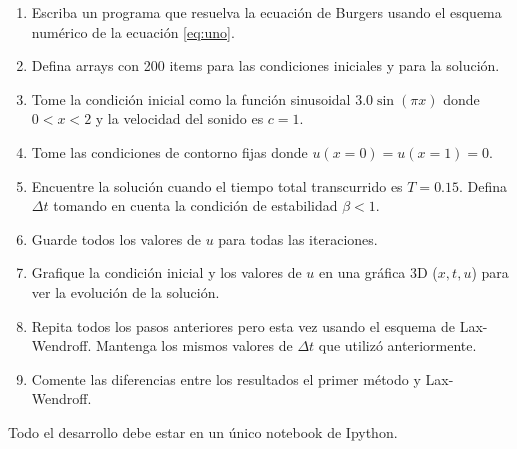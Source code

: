 \documentclass{article}
\begin{document}
\begin{enumerate}
\item Escriba un programa que resuelva la ecuaci\'on de Burgers usando
  el esquema num\'erico de la ecuaci\'on \ref{eq:uno}. 
\item Defina arrays con 200 items para las condiciones iniciales y
  para la soluci\'on.
\item Tome la condici\'on inicial como la funci\'on sinusoidal
  $3.0\sin(\pi x)$ donde $0<x<2$ y la velocidad del sonido es $c=1$.
\item Tome las condiciones de contorno fijas donde $u(x=0)=u(x=1)=0$.
\item Encuentre la soluci\'on cuando el tiempo total transcurrido es
  $T=0.15$. Defina $\Delta t$ tomando en cuenta la condici\'on de
  estabilidad $\beta<1$. 
\item Guarde todos los valores de $u$ para todas las iteraciones.
\item Grafique la condici\'on inicial y los valores de $u$ en una
  gr\'afica 3D ($x,t,u$) para ver la evoluci\'on de la soluci\'on.
\item Repita todos los pasos anteriores pero esta vez usando el
  esquema de Lax-Wendroff. Mantenga los mismos valores de $\Delta t$
  que utiliz\'o anteriormente. 
\item Comente las diferencias entre los resultados el primer m\'etodo y Lax-Wendroff.
\end{enumerate}

Todo el desarrollo debe estar en un \'unico notebook de Ipython.
\end{document}
